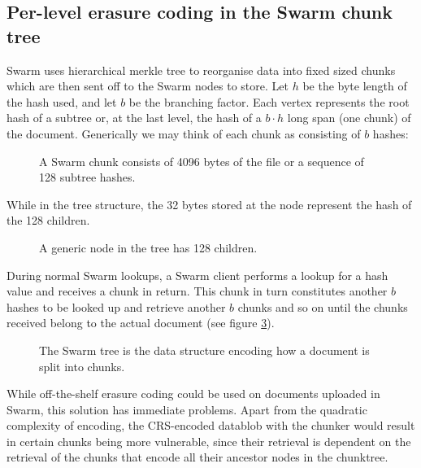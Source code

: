 \subsection{Per-level erasure coding in the Swarm chunk tree}

Swarm uses hierarchical merkle tree \cite{merkle1980protocols} to reorganise data into fixed sized chunks which are then sent off to the Swarm nodes to store.
Let $h$ be the byte length of the hash used, and let $b$ be the branching factor. Each vertex represents the root hash of a subtree or, at the last level, the hash of a $b\cdot h$ long span (one chunk) of the document. Generically we may think of each chunk as consisting of $b$ hashes:


\begin{figure}[htbp]
   \centering
   
   \caption[Swarm chunk]{A Swarm chunk consists of 4096 bytes of the file or a sequence of 128 subtree hashes.}
   \label{fig:chunk}
\end{figure}

While in the tree structure, the 32 bytes stored at the node represent the hash of the 128 children.

\begin{figure}[htbp]
   \centering
   
   \caption[A generic node in the tree has 128 children]{A generic node in the tree has 128 children.}
   \label{fig:Swarm-hash-basic}
\end{figure}

During normal Swarm lookups, a Swarm client performs a lookup for a hash value and receives a chunk in return. This chunk in turn constitutes another $b$ hashes to be looked up and retrieve another $b$ chunks and so on until the chunks received belong to the actual document (see figure \ref{fig:Swarm-hash-split}).


\begin{figure}[htbp]
   \centering
   
   \caption[Swarm hash split]{The Swarm tree is the data structure encoding how a document is split into chunks.}
   \label{fig:Swarm-hash-split}
\end{figure}

While off-the-shelf erasure coding could be used on documents uploaded in Swarm, this solution has immediate problems. Apart from the quadratic complexity of encoding,  the CRS-encoded datablob with the chunker would result in certain chunks being more vulnerable, since their retrieval is dependent on the retrieval of the chunks that encode all their ancestor nodes in the chunktree.

